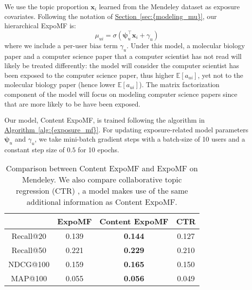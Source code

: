 \documentclass{sig-alternate-arxiv}
\begin{document}
We use the topic proportion $\mathbf{x}_i$ learned from the Mendeley dataset as
exposure covariates. Following the notation of {\hyperref[sec:{modeling_mu}]{Section~\ref*{sec:{modeling_mu}}}}, our
hierarchical ExpoMF is:
\begin{displaymath} \mu_{ui}= \sigma(\boldsymbol\psi_u^\top \mathbf{x}_i + \gamma_u)\end{displaymath}
where we include a per-user bias term $\gamma_u$. Under this model, a
molecular biology paper and a computer science paper that a computer
scientist has not read will likely be treated differently: the model will
consider the computer scientist has been exposed to the computer science
paper, thus higher $\mathbb{E}[a_{ui}]$, yet not to the molecular biology
paper (hence lower $\mathbb{E}[a_{ui}]$). The matrix factorization
component of the model will focus on modeling computer science papers
since that are more likely to be have been exposed. 

Our model, Content ExpoMF, is trained following the algorithm in
{\hyperref[alg:{exposure_mf}]{Algorithm~\ref*{alg:{exposure_mf}}}}. For updating exposure-related model parameters
$\boldsymbol\psi_{u}$ and $\gamma_u$, we take mini-batch gradient steps with a
batch-size of 10 users and a constant step size of $0.5$ for 10 epochs.

\begin{table}
\centering
\begin{tabular}{ c c c c}
\hline
            & ExpoMF & Content ExpoMF & CTR \cite{wang2011collaborative} \\ \hline
  Recall@20 & 0.139 & \textbf{0.144}         & 0.127 \\ 
  Recall@50 & 0.221 & \textbf{0.229}         & 0.210 \\ 
  NDCG@100  & 0.159 & \textbf{0.165}         & 0.150 \\ 
  MAP@100   & 0.055 & \textbf{0.056}        & 0.049 \\ 
\hline 
\end{tabular}
\caption{Comparison between Content ExpoMF and ExpoMF on Mendeley. We also compare collaborative topic regression (CTR) \cite{wang2011collaborative}, a model makes use of the same additional information as Content ExpoMF. }
\label{tab:si_doc_results}
\end{table}
\end{document}
